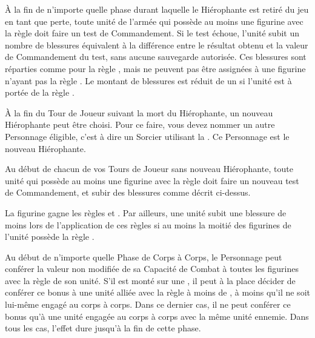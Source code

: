 \vspace*{1.5cm}
\startarmyspecialrules

\armyspecialruleentry{\dusttodust}

À la fin de n'importe quelle phase durant laquelle le Hiérophante est retiré du jeu en tant que perte, toute unité de l'armée qui possède au moins une figurine avec la règle \dusttodust{} doit faire un test de Commandement. Si le test échoue, l'unité subit un nombre de blessures équivalent à la différence entre le résultat obtenu et la valeur de Commandement du test, sans aucune sauvegarde autorisée. Ces blessures sont réparties comme pour la règle \unstable{}, mais ne peuvent pas être assignées à une figurine n'ayant pas la règle \dusttodust{}. Le montant de blessures est réduit de un si l'unité est à portée de la règle \holdyourground{}.

À la fin du Tour de Joueur suivant la mort du Hiérophante, un nouveau Hiérophante peut être choisi. Pour ce faire, vous devez nommer un autre Personnage éligible, c'est à dire un Sorcier utilisant la \Pathof{} \sands{}. Ce Personnage est le nouveau Hiérophante.

Au début de chacun de vos Tours de Joueur sans nouveau Hiérophante, toute unité qui possède au moins une figurine avec la règle \dusttodust{} doit faire un nouveau test de Commandement, et subir des blessures comme décrit ci-dessus.

\armyspecialruleentry{\undeadconstruct}

La figurine gagne les règles \dusttodust{} et \undead{}. Par ailleurs, une unité subit une blessure de moins lors de l'application de ces règles si au moins la moitié des figurines de l'unité possède la règle \undeadconstruct{}.

\armyspecialruleentry{\undyingwill}

Au début de n'importe quelle Phase de Corps à Corps, le Personnage peut conférer la valeur non modifiée de sa Capacité de Combat à toutes les figurines avec la règle \undead{} de son unité. S'il est monté sur une \largetarget{}, il peut à la place décider de conférer ce bonus à une unité alliée avec la règle \undead{} à moins de , à moins qu'il ne soit lui-même engagé au corps à corps. Dans ce dernier cas, il ne peut conférer ce bonus qu'à une unité \undead{} engagée au corps à corps avec la même unité ennemie. Dans tous les cas, l'effet dure jusqu'à la fin de cette phase.

\armyspecialruleentry{\necromanticaura}

